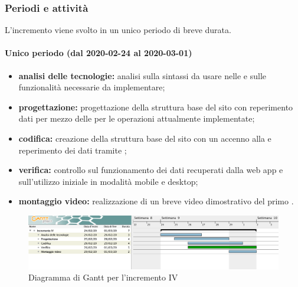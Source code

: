 			\subsubsection{Periodi e attività}
			
				L'incremento viene svolto in un unico periodo di breve durata.
				
				\paragraph{Unico periodo (dal 2020-02-24 al 2020-03-01)}
				
					\begin{itemize}
						\item \textbf{analisi delle tecnologie:} analisi sulla sintassi da usare nelle  e sulle funzionalità necessarie da implementare;	
						\item \textbf{progettazione:} progettazione della struttura base del sito con reperimento dati per mezzo delle  per le operazioni attualmente implementate;
						\item \textbf{codifica:} creazione della struttura base del sito con un accenno alla  e reperimento dei dati tramite ;
						\item \textbf{verifica:} controllo sul funzionamento dei dati recuperati dalla web app e sull'utilizzo iniziale in modalità mobile e desktop;
						\item \textbf{montaggio video:} realizzazione di un breve video dimostrativo del primo .
					\end{itemize} 			

		\begin{landscape}
          \begin{figure}[H]
            \centering
            \includegraphics[width=\linewidth]{images/gantt/incrementoIV} %
            \caption{Diagramma di Gantt per l'incremento IV}
          \end{figure}		
		\end{landscape}


